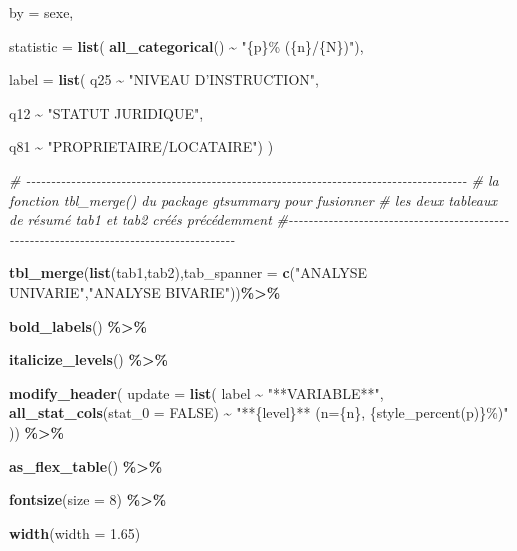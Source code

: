 \documentclass[
]{article}
\newenvironment{Shaded}{\begin{snugshade}}{\end{snugshade}}
\newcommand{\AttributeTok}[1]{\textcolor[rgb]{0.13,0.29,0.53}{#1}}
\newcommand{\CommentTok}[1]{\textcolor[rgb]{0.56,0.35,0.01}{\textit{#1}}}
\newcommand{\ConstantTok}[1]{\textcolor[rgb]{0.56,0.35,0.01}{#1}}
\newcommand{\DecValTok}[1]{\textcolor[rgb]{0.00,0.00,0.81}{#1}}
\newcommand{\FloatTok}[1]{\textcolor[rgb]{0.00,0.00,0.81}{#1}}
\newcommand{\FunctionTok}[1]{\textcolor[rgb]{0.13,0.29,0.53}{\textbf{#1}}}
\newcommand{\NormalTok}[1]{#1}
\newcommand{\SpecialCharTok}[1]{\textcolor[rgb]{0.81,0.36,0.00}{\textbf{#1}}}
\newcommand{\StringTok}[1]{\textcolor[rgb]{0.31,0.60,0.02}{#1}}
\begin{document}
\begin{Shaded}
\begin{Highlighting}[]
    \AttributeTok{by =}\NormalTok{ sexe,}
    
    \AttributeTok{statistic =}  \FunctionTok{list}\NormalTok{( }\FunctionTok{all\_categorical}\NormalTok{() }\SpecialCharTok{\textasciitilde{}} \StringTok{"\{p\}\% (\{n\}/\{N\})"}\NormalTok{),}
    
    \AttributeTok{label =} \FunctionTok{list}\NormalTok{( q25 }\SpecialCharTok{\textasciitilde{}} \StringTok{"NIVEAU D’INSTRUCTION"}\NormalTok{,}
                  
\NormalTok{                  q12 }\SpecialCharTok{\textasciitilde{}} \StringTok{"STATUT JURIDIQUE"}\NormalTok{,}
                  
\NormalTok{                  q81 }\SpecialCharTok{\textasciitilde{}} \StringTok{"PROPRIETAIRE/LOCATAIRE"}\NormalTok{)}
\NormalTok{  )}



\CommentTok{\# {-}{-}{-}{-}{-}{-}{-}{-}{-}{-}{-}{-}{-}{-}{-}{-}{-}{-}{-}{-}{-}{-}{-}{-}{-}{-}{-}{-}{-}{-}{-}{-}{-}{-}{-}{-}{-}{-}{-}{-}{-}{-}{-}{-}{-}{-}{-}{-}{-}{-}{-}{-}{-}{-}{-}{-}{-}{-}{-}{-}{-}{-}{-}{-}{-}{-}{-}{-}{-}{-}{-}{-}{-}{-}{-}{-}{-}{-}{-}{-}{-}{-}{-}{-}{-}{-}{-}{-}}
\CommentTok{\# la fonction tbl\_merge() du package gtsummary pour fusionner}
\CommentTok{\#  les deux tableaux de résumé tab1 et tab2 créés précédemment}
\CommentTok{\#{-}{-}{-}{-}{-}{-}{-}{-}{-}{-}{-}{-}{-}{-}{-}{-}{-}{-}{-}{-}{-}{-}{-}{-}{-}{-}{-}{-}{-}{-}{-}{-}{-}{-}{-}{-}{-}{-}{-}{-}{-}{-}{-}{-}{-}{-}{-}{-}{-}{-}{-}{-}{-}{-}{-}{-}{-}{-}{-}{-}{-}{-}{-}{-}{-}{-}{-}{-}{-}{-}{-}{-}{-}{-}{-}{-}{-}{-}{-}{-}{-}{-}{-}{-}{-}{-}{-}{-}{-}}



\FunctionTok{tbl\_merge}\NormalTok{(}\FunctionTok{list}\NormalTok{(tab1,tab2),}\AttributeTok{tab\_spanner =} \FunctionTok{c}\NormalTok{(}\StringTok{"ANALYSE UNIVARIE"}\NormalTok{,}\StringTok{"ANALYSE BIVARIE"}\NormalTok{))}\SpecialCharTok{\%\textgreater{}\%}
  
  
  \FunctionTok{bold\_labels}\NormalTok{() }\SpecialCharTok{\%\textgreater{}\%} 
  
  
  \FunctionTok{italicize\_levels}\NormalTok{()  }\SpecialCharTok{\%\textgreater{}\%} 
  
  
  \FunctionTok{modify\_header}\NormalTok{(}
    \AttributeTok{update =} \FunctionTok{list}\NormalTok{( label }\SpecialCharTok{\textasciitilde{}} \StringTok{"**VARIABLE**"}\NormalTok{,}
                   \FunctionTok{all\_stat\_cols}\NormalTok{(}\AttributeTok{stat\_0 =} \ConstantTok{FALSE}\NormalTok{) }\SpecialCharTok{\textasciitilde{}} \StringTok{"**\{level\}** (n=\{n\}, \{style\_percent(p)\}\%)"}
\NormalTok{  )) }\SpecialCharTok{\%\textgreater{}\%} 
  
  
  \FunctionTok{as\_flex\_table}\NormalTok{() }\SpecialCharTok{\%\textgreater{}\%}
  
  
  \FunctionTok{fontsize}\NormalTok{(}\AttributeTok{size =} \DecValTok{8}\NormalTok{) }\SpecialCharTok{\%\textgreater{}\%}
  
  
  \FunctionTok{width}\NormalTok{(}\AttributeTok{width =} \FloatTok{1.65}\NormalTok{)}
\end{Highlighting}
\end{Shaded}
\end{document}
